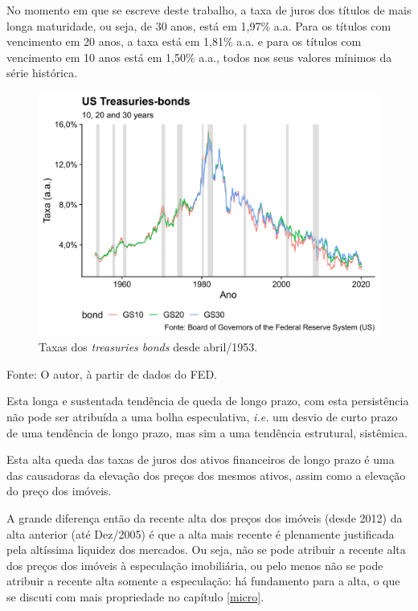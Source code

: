 \documentclass[
	12pt,				%
	oneside,			%
	a4paper,			%
	chapter=TITLE,		%
	section=TITLE,		%
	english,			%
	brazil				%
	]{abntex2}
\newcommand{\bcenter}{\begin{center}}
\newcommand{\ecenter}{\end{center}}
\begin{document}
No momento em que se escreve deste trabalho, a taxa de juros dos títulos de mais
longa maturidade, ou seja, de 30 anos, está em 1,97\% a.a. Para
os títulos com vencimento em 20 anos, a taxa está em
1,81\% a.a. e para os títulos com
vencimento em 10 anos está em
1,50\% a.a., todos nos seus valores
mínimos da série histórica.
\begin{figure}[H]

{\centering \includegraphics[width=\textwidth]{images/fred-1} 

}

\caption{Taxas dos \emph{treasuries bonds} desde abril/1953.}\label{fig:fred}
\end{figure}
\bcenter

Fonte: O autor, à partir de dados do \gls{FED}.
\ecenter

Esta longa e sustentada tendência de queda de longo prazo, com esta persistência
não pode ser atribuída a uma bolha especulativa, \emph{i.e.} um desvio de curto prazo
de uma tendência de longo prazo, mas sim a uma tendência estrutural, sistêmica.

Esta alta queda das taxas de juros dos ativos financeiros de longo prazo é uma
das causadoras da elevação dos preços dos mesmos ativos, assim como a elevação
do preço dos imóveis.

A grande diferença então da recente alta dos preços dos imóveis (desde 2012) da
alta anterior (até Dez/2005) é que a alta mais recente é plenamente justificada
pela altíssima liquidez dos mercados. Ou seja, não se pode atribuir a recente
alta dos preços dos imóveis à especulação imobiliária, ou pelo menos não se pode
atribuir a recente alta somente a especulação: há fundamento para a alta, o que
se discuti com mais propriedade no capítulo \ref{micro}.
\end{document}
